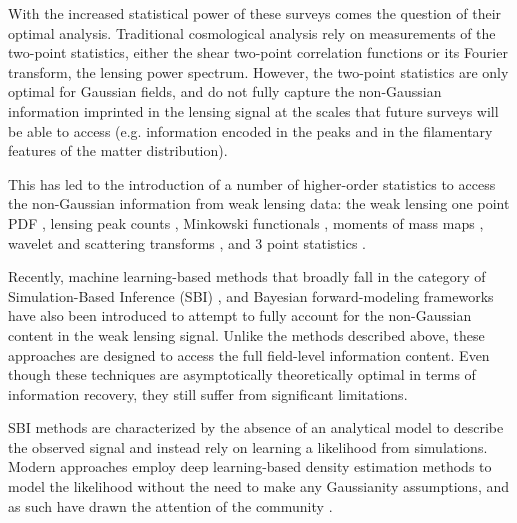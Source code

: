 \documentclass{aa}
\begin{document}
With the increased statistical power of these surveys comes the question of their optimal analysis. Traditional cosmological analysis rely on measurements of the two-point statistics, either the shear two-point correlation functions or its Fourier transform, the lensing power spectrum. However, the two-point statistics are only optimal for Gaussian fields, and do not fully capture the non-Gaussian information imprinted in the lensing signal at the scales that future surveys will be able to access (e.g. information encoded in the peaks and in the filamentary features of the matter distribution).

 This has led to the introduction of a number of  higher-order statistics to access the non-Gaussian information from weak lensing data: 
the weak lensing one point PDF \citep{liu2019constraining, uhlemann2020fisher, boyle2021nuw}, lensing peak counts \citep{liu2015cosmology, liu2015cosmological, lin2015new, kacprzak2016cosmology, peel2017cosmological, shan2018kids, martinet2018kids, ajani2020constraining, harnois2021cosmic, zurcher2022dark}, Minkowski functionals \citep{kratochvil2012probing, petri2013cosmology}, moments of mass maps \citep{gatti2021dark}, wavelet and scattering transforms \citep{ajani2021starlet, cheng2021weak}, and 3 point statistics \citep{takada2004cosmological, semboloni2011weak, rizzato2019tomographic, halder2021integrated}. 


Recently, machine learning-based methods that broadly fall in the category of Simulation-Based Inference (SBI) \citep{fluri2019cosmological, kacprzak2022deeplss, fluri2021cosmological, jeffrey2021likelihood, fluri2022full}, and Bayesian forward-modeling frameworks \citep{porqueres2021bayesian, sarma2022map} have also been introduced to attempt to fully account for the non-Gaussian content in the weak lensing signal. Unlike the methods described above, these approaches are designed to access the full field-level information content. Even though these techniques are asymptotically theoretically optimal in terms of information recovery, they still suffer from significant limitations.

SBI methods are characterized by the absence of an analytical model to describe the observed signal and instead rely on learning a likelihood from simulations. Modern approaches employ deep learning-based density estimation methods to model the likelihood without the need to make any Gaussianity assumptions, and as such have 
drawn the attention of the community \citep{alsing2018massive, jeffrey2021likelihood}.  
\end{document}

